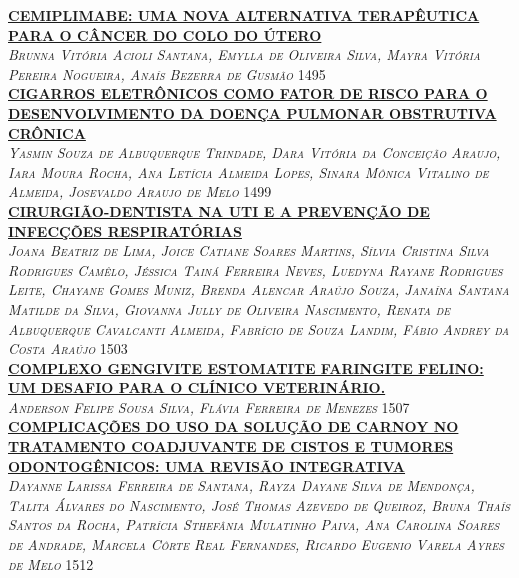 \noindent \textsc{\hyperlink{trabalhos/251816.pdf.1}{\textbf{CEMIPLIMABE: UMA NOVA ALTERNATIVA TERAPÊUTICA PARA O CÂNCER DO COLO DO ÚTERO}}}\\ 
\noindent \textsc{\textit{Brunna Vitória Acioli Santana, Emylla de Oliveira Silva, Mayra Vitória Pereira Nogueira, Anaís Bezerra de Gusmão}} \hfill 1495\\ 

\noindent \textsc{\hyperlink{trabalhos/249994.pdf.1}{\textbf{CIGARROS ELETRÔNICOS COMO FATOR DE RISCO PARA O DESENVOLVIMENTO DA DOENÇA PULMONAR OBSTRUTIVA CRÔNICA}}}\\ 
\noindent \textsc{\textit{Yasmin Souza de Albuquerque Trindade, Dara Vitória da Conceição Araujo, Iara Moura Rocha, Ana Letícia Almeida Lopes, Sinara Mônica Vitalino de Almeida, Josevaldo Araujo de Melo}} \hfill 1499\\ 

\noindent \textsc{\hyperlink{trabalhos/250170.pdf.1}{\textbf{CIRURGIÃO-DENTISTA NA UTI E A PREVENÇÃO DE INFECÇÕES RESPIRATÓRIAS}}}\\ 
\noindent \textsc{\textit{Joana Beatriz de Lima, Joice Catiane Soares Martins, Sílvia Cristina Silva Rodrigues Camêlo, Jéssica Tainá Ferreira Neves, Luedyna Rayane Rodrigues Leite, Chayane Gomes Muniz, Brenda Alencar Araújo Souza, Janaína Santana Matilde da Silva, Giovanna Jully de Oliveira Nascimento, Renata de Albuquerque Cavalcanti Almeida, Fabrício de Souza Landim, Fábio Andrey da Costa Araújo}} \hfill 1503\\ 

\noindent \textsc{\hyperlink{trabalhos/250214.pdf.1}{\textbf{COMPLEXO GENGIVITE ESTOMATITE FARINGITE FELINO: UM DESAFIO PARA O CLÍNICO VETERINÁRIO.}}}\\ 
\noindent \textsc{\textit{Anderson Felipe Sousa Silva, Flávia Ferreira de Menezes}} \hfill 1507\\ 

\noindent \textsc{\hyperlink{trabalhos/249010.pdf.1}{\textbf{COMPLICAÇÕES DO USO DA SOLUÇÃO DE CARNOY NO TRATAMENTO COADJUVANTE DE CISTOS E TUMORES ODONTOGÊNICOS: UMA REVISÃO INTEGRATIVA}}}\\ 
\noindent \textsc{\textit{Dayanne Larissa Ferreira de Santana, Rayza Dayane Silva de Mendonça, Talita Álvares do Nascimento, José Thomas Azevedo de Queiroz, Bruna Thaís Santos da Rocha, Patrícia Sthefânia Mulatinho Paiva, Ana Carolina Soares de Andrade, Marcela Côrte Real Fernandes, Ricardo Eugenio Varela Ayres de Melo}} \hfill 1512\\ 

